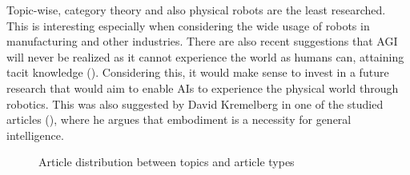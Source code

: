 Topic-wise, category theory and also physical robots are the least researched.
This is interesting especially when considering the wide usage of robots in
manufacturing and other industries. There are also recent suggestions that
AGI will never be realized as it cannot experience the world as humans can,
attaining tacit knowledge (\cite{fjelland2020why}). Considering this, it would
make sense to invest in a future research that would aim to enable AIs to
experience the physical world through robotics. This was also suggested by David
Kremelberg in one of the studied articles (\cite{kremelberg2019embodiment}),
where he argues that embodiment is a necessity for general intelligence.


\topicDataTable
\def\forumCoordsFirst{}
\createSymbolicCoords{\forumCoordsFirst}{\topicDataTable}{Category}
\def\classCoordsFirst{}
\createSymbolicCoords{\classCoordsFirst}{\topicDataTable}{Class}
\begin{figure}[H]
  \centering
  \caption{Article distribution between topics and article types}
  \label{fig:topicbubble}
\end{figure}


